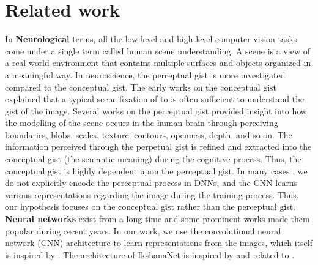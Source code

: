 \documentclass{article}
\begin{document}
\section{Related work}
\label{related work}
In \textbf{Neurological} terms, all the low-level and high-level computer vision tasks come under a single term called human scene understanding. A scene is a view of a real-world environment that contains multiple surfaces and objects organized in a meaningful way. In neuroscience, the perceptual gist is more investigated compared to the conceptual gist. The early works on the conceptual gist \cite{potter1975meaning,intraub1981rapid} explained that a typical scene fixation of  to   is often sufficient to understand the gist of the image. Several works on the perceptual gist \cite{biederman1987recognition,rayner1998eye,schyns1994blobs,oliva1997coarse,oliva2000diagnostic,oliva2001modeling,henderson2003human,evans2005perception,fei2007we} provided insight into how the modelling of the scene occurs in the human brain through perceiving boundaries, blobs, scales, texture, contours, openness, depth, and so on. The information perceived through the perpetual gist is refined and extracted into the conceptual gist (the semantic meaning) during the cognitive process. Thus, the conceptual gist is highly dependent upon the perceptual gist.
In many cases \cite{deng2009imagenet,cordts2016cityscapes,8100027}, we do not explicitly encode the perceptual process in DNNs, and the CNN learns various representations regarding the image during the training process. Thus, our hypothesis focuses on the conceptual gist rather than the perceptual gist. \newline
\textbf{Neural networks} exist from a long time  \cite{mcculloch1943logical,rumelhart1986learning,rosenblatt1958perceptron} and some prominent works  \cite{deng2009imagenet,krizhevsky25hinton,lin2013network,simonyan2014very,7298594,he2016deep,44903,8099678} made them popular during recent years. In our work, we use the convolutional neural network (CNN) architecture  \cite{lecun1998gradient,21701} to learn representations from the images, which itself is inspired by \cite{hubel1962receptive,fukushima1983neocognitron}. The architecture of IkshanaNet is inspired by \cite{simonyan2014very,huang2017densely} and related to \cite{huang2018multiscale,liao2016bridging}.\newline
\end{document}

